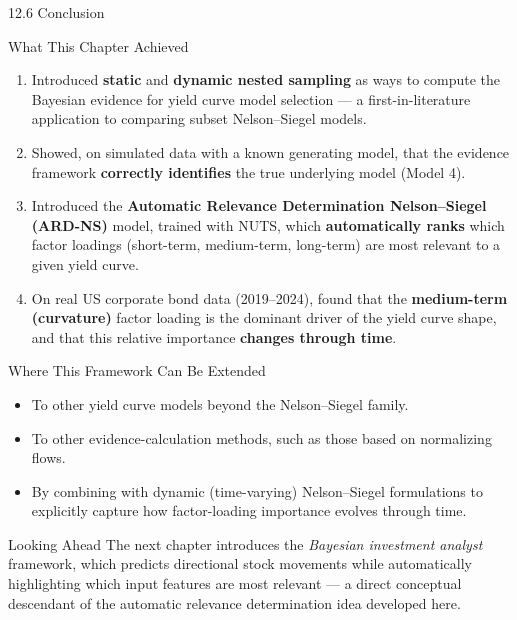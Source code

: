 \documentclass[aspectratio=169,10pt]{beamer}
\begin{document}
\begin{frame}[allowframebreaks]{12.6 Conclusion}

\begin{block}{What This Chapter Achieved}
\begin{enumerate}
  \item Introduced \textbf{static} and \textbf{dynamic nested sampling} as ways to compute the Bayesian evidence for yield curve model selection --- a first-in-literature application to comparing subset Nelson--Siegel models.
  \item Showed, on simulated data with a known generating model, that the evidence framework \textbf{correctly identifies} the true underlying model (Model 4).
  \item Introduced the \textbf{Automatic Relevance Determination Nelson--Siegel (ARD-NS)} model, trained with NUTS, which \textbf{automatically ranks} which factor loadings (short-term, medium-term, long-term) are most relevant to a given yield curve.
  \item On real US corporate bond data (2019--2024), found that the \textbf{medium-term (curvature)} factor loading is the dominant driver of the yield curve shape, and that this relative importance \textbf{changes through time}.
\end{enumerate}
\end{block}

\begin{block}{Where This Framework Can Be Extended}
\begin{itemize}
  \item To other yield curve models beyond the Nelson--Siegel family.
  \item To other evidence-calculation methods, such as those based on normalizing flows.
  \item By combining with dynamic (time-varying) Nelson--Siegel formulations to explicitly capture how factor-loading importance evolves through time.
\end{itemize}
\end{block}

\begin{exampleblock}{Looking Ahead}
The next chapter introduces the \emph{Bayesian investment analyst} framework, which predicts directional stock movements while automatically highlighting which input features are most relevant --- a direct conceptual descendant of the automatic relevance determination idea developed here.
\end{exampleblock}

\end{frame}
\end{document}
